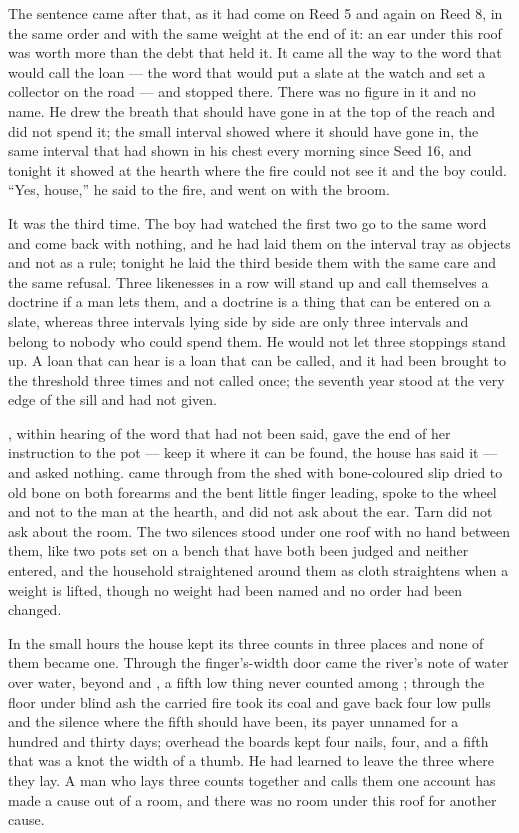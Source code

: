 The sentence came after that, as it had come on Reed 5 and again on Reed 8, in the same order and with the same weight at the end of it: an ear under this roof was worth more than the debt that held it. It came all the way to the word that would call the loan --- the word that would put a slate at the watch and set a collector on the road --- and stopped there. There was no figure in it and no name. He drew the breath that should have gone in at the top of the reach and did not spend it; the small interval showed where it should have gone in, the same interval that had shown in his chest every morning since Seed 16, and tonight it showed at the hearth where the fire could not see it and the boy could. “Yes, house,” he said to the fire, and went on with the broom.

It was the third time. The boy had watched the first two go to the same word and come back with nothing, and he had laid them on the interval tray as objects and not as a rule; tonight he laid the third beside them with the same care and the same refusal. Three likenesses in a row will stand up and call themselves a doctrine if a man lets them, and a doctrine is a thing that can be entered on a slate, whereas three intervals lying side by side are only three intervals and belong to nobody who could spend them. He would not let three stoppings stand up. A loan that can hear is a loan that can be called, and it had been brought to the threshold three times and not called once; the seventh year stood at the very edge of the sill and had not given.

, within hearing of the word that had not been said, gave the end of her instruction to the pot --- keep it where it can be found, the house has said it --- and asked nothing.  came through from the shed with bone-coloured slip dried to old bone on both forearms and the bent little finger leading, spoke to the wheel and not to the man at the hearth, and did not ask about the ear. Tarn did not ask about the room. The two silences stood under one roof with no hand between them, like two pots set on a bench that have both been judged and neither entered, and the household straightened around them as cloth straightens when a weight is lifted, though no weight had been named and no order had been changed.

\scenebreak

In the small hours the house kept its three counts in three places and none of them became one. Through the finger's-width door came the river's note of water over water, beyond  and , a fifth low thing never counted among ; through the floor under blind ash the carried fire took its coal and gave back four low pulls and the silence where the fifth should have been, its payer unnamed for a hundred and thirty days; overhead the boards kept four nails, four, and a fifth that was a knot the width of a thumb. He had learned to leave the three where they lay. A man who lays three counts together and calls them one account has made a cause out of a room, and there was no room under this roof for another cause.


